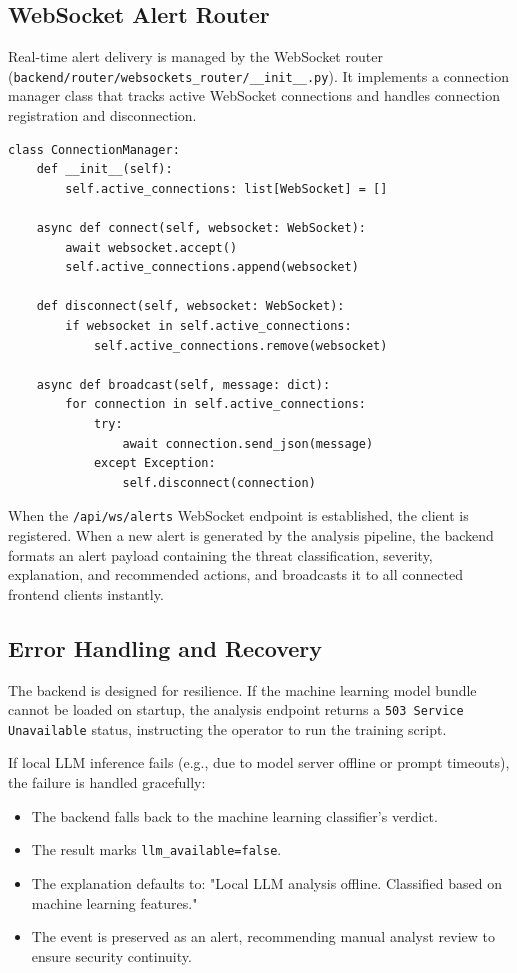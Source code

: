 \documentclass[12pt,a4paper]{report}
\begin{document}
\subsection{WebSocket Alert Router}

Real-time alert delivery is managed by the WebSocket router (\texttt{backend/router/websockets\_router/\_\_init\_\_.py}). It implements a connection manager class that tracks active WebSocket connections and handles connection registration and disconnection.

\begin{lstlisting}[style=pythonstyle, caption={WebSocket connection manager implementation}]
class ConnectionManager:
    def __init__(self):
        self.active_connections: list[WebSocket] = []

    async def connect(self, websocket: WebSocket):
        await websocket.accept()
        self.active_connections.append(websocket)

    def disconnect(self, websocket: WebSocket):
        if websocket in self.active_connections:
            self.active_connections.remove(websocket)

    async def broadcast(self, message: dict):
        for connection in self.active_connections:
            try:
                await connection.send_json(message)
            except Exception:
                self.disconnect(connection)
\end{lstlisting}

When the \texttt{/api/ws/alerts} WebSocket endpoint is established, the client is registered. When a new alert is generated by the analysis pipeline, the backend formats an alert payload containing the threat classification, severity, explanation, and recommended actions, and broadcasts it to all connected frontend clients instantly.

\subsection{Error Handling and Recovery}

The backend is designed for resilience. If the machine learning model bundle cannot be loaded on startup, the analysis endpoint returns a \texttt{503 Service Unavailable} status, instructing the operator to run the training script.

If local LLM inference fails (e.g., due to model server offline or prompt timeouts), the failure is handled gracefully:
\begin{itemize}[leftmargin=1.5em]
  \item The backend falls back to the machine learning classifier's verdict.
  \item The result marks \texttt{llm\_available=false}.
  \item The explanation defaults to: "Local LLM analysis offline. Classified based on machine learning features."
  \item The event is preserved as an alert, recommending manual analyst review to ensure security continuity.
\end{itemize}
\end{document}
